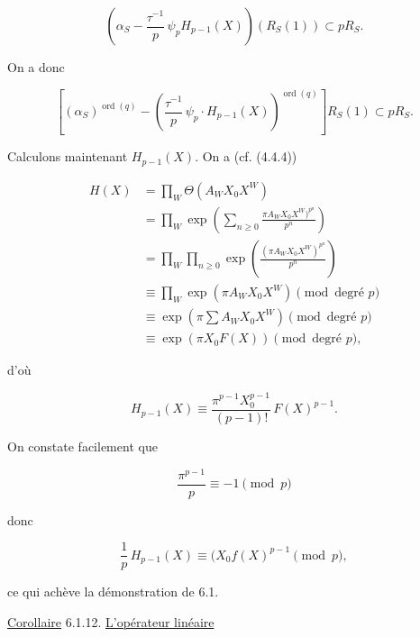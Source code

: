 \begin{equation}\tag{6.1.6}
\left(
\alpha_S-\frac{\tau^{-1}}p\,\psi_pH_{p-1}(X)
\right)(R_S(1))
\subset pR_S.
\end{equation}

On a donc

\begin{equation}\tag{6.1.7}
\left[
(\alpha_S)^{\operatorname{ord}(q)}
-
\left(
\frac{\tau^{-1}}p\,\psi_p\cdot H_{p-1}(X)
\right)^{\operatorname{ord}(q)}
\right]R_S(1)
\subset pR_S.
\end{equation}

Calculons maintenant $H_{p-1}(X)$. On a (cf. (4.4.4))


\begin{equation}\tag{6.1.8}
\begin{aligned}
H(X)
&=\prod_W\Theta(A_WX_0X^W)\\
&=\prod_W\exp\!\left(
\sum_{n\geq0}\frac{\pi A_WX_0X^W)^{p^n}}{p^n}
\right)\\
&=\prod_W\prod_{n\geq0}
\exp\!\left(\frac{(\pi A_WX_0X^W)^{p^n}}{p^n}\right)\\
&\equiv\prod_W\exp(\pi A_WX_0X^W)
\pmod{\text{degré }p}\\
&\equiv\exp\!\left(\pi\sum A_WX_0X^W\right)
\pmod{\text{degré }p}\\
&\equiv\exp(\pi X_0F(X))
\pmod{\text{degré }p},
\end{aligned}
\end{equation}

d'où

\begin{equation}\tag{6.1.9}
H_{p-1}(X)
\equiv\frac{\pi^{p-1}X_0^{p-1}}{(p-1)!}\,F(X)^{p-1}.
\end{equation}

On constate facilement que

\begin{equation}\tag{6.1.10}
\frac{\pi^{p-1}}p\equiv-1\pmod p
\end{equation}

donc

\begin{equation}\tag{6.1.11}
\frac1p\,H_{p-1}(X)
\equiv(X_0f(X)^{p-1}\pmod p,
\end{equation}

ce qui achève la démonstration de 6.1.

\underline{Corollaire} 6.1.12.
\underline{L'opérateur linéaire}

